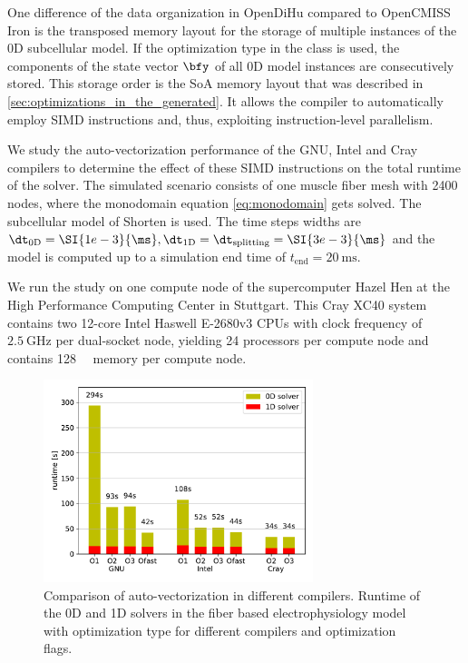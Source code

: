 One difference of the data organization in OpenDiHu compared to OpenCMISS Iron is the transposed memory layout for the storage of multiple instances of the 0D subcellular model. If the  optimization type in the  class is used, the components of the state vector $\bfy$ of all 0D model instances are consecutively stored. This storage order is the SoA memory layout that was described in \cref{sec:optimizations_in_the_generated}. It allows the compiler to automatically employ SIMD instructions and, thus, exploiting instruction-level parallelism.

We study the auto-vectorization performance of the GNU, Intel and Cray compilers to determine the effect of these SIMD instructions on the total runtime of the solver. The simulated scenario consists of one muscle fiber mesh with 2400 nodes, where the monodomain equation \cref{eq:monodomain} gets solved. The subcellular model of Shorten is used. The time steps widths are $\dt_\text{0D} = \SI{1e-3}{\ms}, \dt_\text{1D} = \dt_\text{splitting} = \SI{3e-3}{\ms}$ and the model is computed up to a simulation end time of $t_\text{end} = \SI{20}{\ms}$.

We run the study on one compute node of the supercomputer Hazel Hen at the High Performance Computing Center in Stuttgart. This Cray XC40 system contains two 12-core Intel Haswell E-2680v3 CPUs with clock frequency of $\SI{2.5}{\giga\hertz}$ per dual-socket node, yielding 24 processors per compute node and contains \SI{128}{\giga\byte} memory per compute node.

\begin{figure}
  \centering%
  \includegraphics[width=0.7\textwidth]{images/results/studies/compilers.pdf}%
  \caption{Comparison of auto-vectorization in different compilers. Runtime of the 0D and 1D solvers in the fiber based electrophysiology model with  optimization type for different compilers and optimization flags.}%
  \label{fig:compilers}%
\end{figure}%

